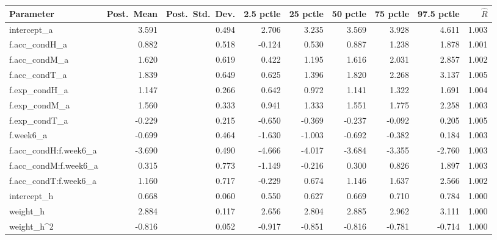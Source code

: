 \begin{tabular}{lrrrrrrrr}
\toprule
Parameter & Post.\ Mean & Post.\ Std.\ Dev. & 2.5 pctle & 25 pctle & 50 pctle & 75 pctle & 97.5 pctle & $\hat{R}$ \\
\midrule
intercept\_a & 3.591 & 0.494 & 2.706 & 3.235 & 3.569 & 3.928 & 4.611 & 1.003 \\
f.acc\_condH\_a & 0.882 & 0.518 & -0.124 & 0.530 & 0.887 & 1.238 & 1.878 & 1.001 \\
f.acc\_condM\_a & 1.620 & 0.619 & 0.422 & 1.195 & 1.616 & 2.031 & 2.857 & 1.002 \\
f.acc\_condT\_a & 1.839 & 0.649 & 0.625 & 1.396 & 1.820 & 2.268 & 3.137 & 1.005 \\
f.exp\_condH\_a & 1.147 & 0.266 & 0.642 & 0.972 & 1.141 & 1.322 & 1.691 & 1.004 \\
f.exp\_condM\_a & 1.560 & 0.333 & 0.941 & 1.333 & 1.551 & 1.775 & 2.258 & 1.003 \\
f.exp\_condT\_a & -0.229 & 0.215 & -0.650 & -0.369 & -0.237 & -0.092 & 0.205 & 1.005 \\
f.week6\_a & -0.699 & 0.464 & -1.630 & -1.003 & -0.692 & -0.382 & 0.184 & 1.003 \\
f.acc\_condH:f.week6\_a & -3.690 & 0.490 & -4.666 & -4.017 & -3.684 & -3.355 & -2.760 & 1.003 \\
f.acc\_condM:f.week6\_a & 0.315 & 0.773 & -1.149 & -0.216 & 0.300 & 0.826 & 1.897 & 1.003 \\
f.acc\_condT:f.week6\_a & 1.160 & 0.717 & -0.229 & 0.674 & 1.146 & 1.637 & 2.566 & 1.002 \\
intercept\_h & 0.668 & 0.060 & 0.550 & 0.627 & 0.669 & 0.710 & 0.784 & 1.000 \\
weight\_h & 2.884 & 0.117 & 2.656 & 2.804 & 2.885 & 2.962 & 3.111 & 1.000 \\
weight\_h^2 & -0.816 & 0.052 & -0.917 & -0.851 & -0.816 & -0.781 & -0.714 & 1.000 \\
\bottomrule
\end{tabular}

